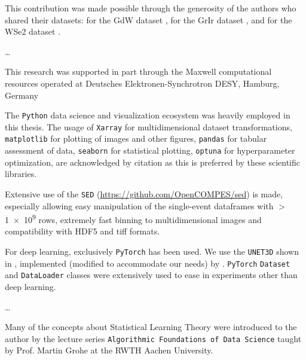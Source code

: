 
This contribution was made possible through the generosity of the authors who shared their datasets: \citeauthor{kutnyakhovMultidimensionalPhotoemissionSpectra2024} for the \gls{GdW} dataset \cite{kutnyakhovMultidimensionalPhotoemissionSpectra2024}, \citeauthor{heberMultispectralTimeresolvedEnergy2022} for the \gls{GrIr} dataset \cite{heberMultispectralTimeresolvedEnergy2022}, and \citeauthor{maklarTimeresolvedARPESRAW2022} for the \gls{WSe2} dataset \cite{maklarTimeresolvedARPESRAW2022}.

\dots

This research was supported in part through the Maxwell computational resources operated at Deutsches Elektronen-Synchrotron DESY, Hamburg, Germany

The \texttt{Python} data science and visualization ecosystem was heavily employed in this thesis.
The usage of \texttt{Xarray} \cite{hoyerXarrayNDLabeled2017} for multidimensional dataset transformations, \texttt{matplotlib} \cite{hunterMatplotlib2DGraphics2007} for plotting of images and other figures, \texttt{pandas} \cite{thepandasdevelopmentteamPandasdevPandasPandas2024} for tabular assessment of data, \texttt{seaborn} \cite{waskomSeabornStatisticalData2021} for statistical plotting, \texttt{optuna} \cite{akibaOptunaNextgenerationHyperparameter2019} for hyperparameter optimization, are acknowledged by citation as this is preferred by these scientific libraries. 

Extensive use of the \texttt{SED} (\href{https://github.com/OpenCOMPES/sed}{https://github.com/OpenCOMPES/sed}) is made, especially allowing easy manipulation of the single-event dataframes with $>$\num{1e9} rows, extremely fast binning to multidimensional images and compatibility with HDF5 and tiff formats.

For deep learning, exclusively \texttt{PyTorch} \cite{paszkePyTorchImperativeStyle2019} has been used. We use the \texttt{UNET3D} shown in \cite{cicek3DUNetLearning2016}, implemented (modified to accommodate our needs) by \citeauthor{wolnyAccurateVersatile3D2020} \cite{wolnyAccurateVersatile3D2020}. \texttt{PyTorch} \texttt{Dataset} and \texttt{DataLoader} classes were extensively used to ease in experiments other than deep learning.


\dots

Many of the concepts about Statistical Learning Theory were introduced to the author by the lecture series \texttt{Algorithmic Foundations of Data Science} taught by Prof. Martin Grohe at the RWTH Aachen University.
